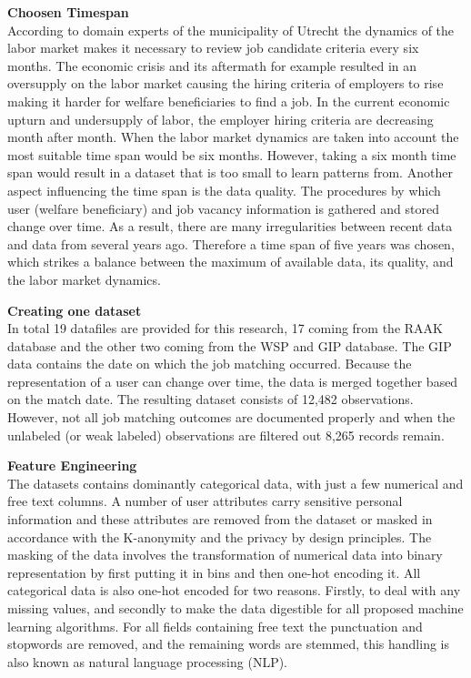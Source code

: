 \noindent
\textbf{Choosen Timespan}\\
According to domain experts of the municipality of Utrecht the dynamics of the labor market makes it necessary to review job candidate criteria every six months.
The economic crisis and its aftermath for example resulted in an oversupply on the labor market causing the hiring criteria of employers to rise making it harder for welfare beneficiaries to find a job.
In the current economic upturn and undersupply of labor, the employer hiring criteria are decreasing month after month. 
When the labor market dynamics are taken into account the most suitable time span would be six months.
However, taking a six month time span would result in a dataset that is too small to learn patterns from.
Another aspect influencing the time span is the data quality.
The procedures by which user (welfare beneficiary) and job vacancy information is gathered and stored change over time.
As a result, there are many irregularities between recent data and data from several years ago.
Therefore a time span of five years was chosen, which strikes a balance between the maximum of available data, its quality, and the labor market dynamics.

\noindent
\textbf{Creating one dataset}\\
In total 19 datafiles are provided for this research, 17 coming from the RAAK database and the other two coming from the WSP and GIP database.
The GIP data contains the date on which the job matching occurred. 
Because the representation of a user can change over time, the data is merged together based on the match date. 
The resulting dataset consists of 12,482 observations.
However, not all job matching outcomes are documented properly and when the unlabeled (or weak labeled) observations are filtered out 8,265 records remain.

\noindent
\textbf{Feature Engineering}\\
The datasets contains dominantly categorical data, with just a few numerical and free text columns.
A number of user attributes carry sensitive personal information and these attributes are removed from the dataset or masked in accordance with the K-anonymity \cite{sweeney2002k} and the privacy by design \cite{d2015privacy} principles.
The masking of the data involves the transformation of numerical data into binary representation by first putting it in bins and then one-hot encoding it. 
All categorical data is also one-hot encoded for two reasons. 
Firstly, to deal with any missing values, and secondly to make the data digestible for all proposed machine learning algorithms. 
For all fields containing free text the punctuation and stopwords are removed, and the remaining words are stemmed, this handling is also known as natural language processing (NLP).

